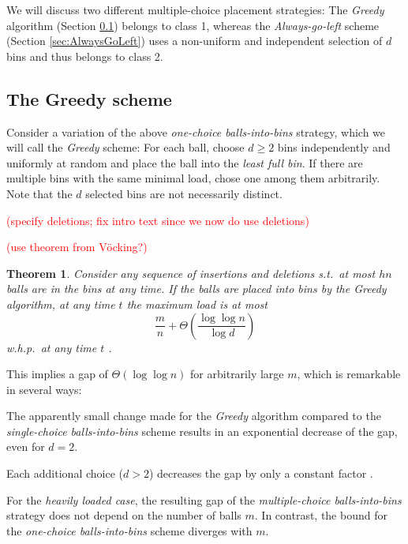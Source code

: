 \documentclass[a4paper,12pt]{article}
\newcommand\todo[1]{\textcolor{red}{(#1)}}
\newtheorem{theorem}[lemma]{Theorem}
\begin{document}
We will discuss two different multiple-choice placement strategies: The \emph{Greedy} algorithm (Section \ref{sec:greedy}) belongs to class 1, whereas the \emph{Always-go-left} scheme (Section \ref{sec:AlwaysGoLeft}) uses a non-uniform and independent selection of $d$ bins and thus belongs to class 2.

\subsection{The Greedy scheme}
\label{sec:greedy}

Consider a variation of the above \emph{one-choice balls-into-bins} strategy, which we will call the \emph{Greedy} scheme: For each ball, choose $d \geq 2$ bins independently and uniformly at random and place the ball into the \emph{least full bin}. If there are multiple bins with the same minimal load, chose one among them arbitrarily. Note that the $d$ selected bins are not necessarily distinct. 

\todo{specify deletions; fix intro text since we now do use deletions}

\todo{use theorem from V\"ocking?}

\begin{theorem}
Consider any sequence of insertions and deletions s.t.~at most $hn$ balls are in the bins at any time. If the balls are placed into bins by the Greedy algorithm, at any time $t$ the maximum load is at most 
\[
\frac{m}{n} + \Theta\left(\frac{\log \log n}{\log d} \right)
\]
w.h.p.~at any time $t$ \cite{ABKU99} \cite{BCSV06}.

\end{theorem}

This implies a gap of $\Theta\left(\log \log n \right)$ for arbitrarily large $m$, which is remarkable in several ways:
\begin{compactitem}
\item The apparently small change made for the \emph{Greedy} algorithm compared to the \emph{single-choice balls-into-bins} scheme results in an exponential decrease of the gap, even for $d=2$. 
\item Each additional choice ($d > 2$) decreases the gap by only a constant factor \cite{MRS01}. 
\item For the \emph{heavily loaded case}, the resulting gap of the \emph{multiple-choice balls-into-bins} strategy does not depend on the number of balls $m$. In contrast, the bound for the \emph{one-choice balls-into-bins} scheme diverges with $m$.
\begin{comment}
\todo{the following is only true for class 1 algorithms}
\item The given bounds are \emph{tight}, meaning that no other strategy that places each ball into one of $d$ randomly selected bins achieves a gap that is asymptotically lower.
\end{comment}
\end{compactitem}
\end{document}
